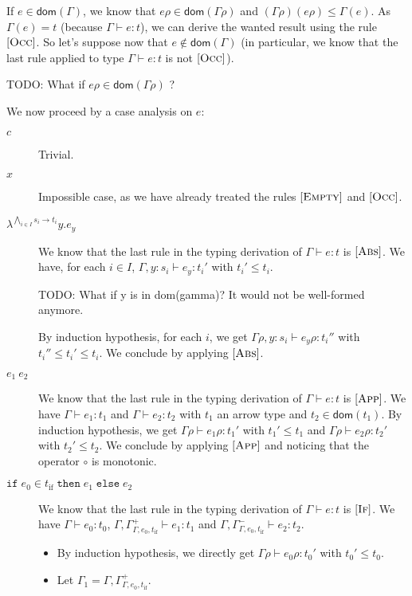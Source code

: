 \documentclass[a4paper]{article}%
\newcommand{\dom}[1]{\textsf{dom}(#1)}
\newcommand{\alt}{~|~}
\newcommand{\ite}[4]{\ensuremath{\texttt{if}\;#1\in#2\;\texttt{then}\;#3\;\texttt{else}\;#4}}
\newcommand{\tyof}[2]{\textsf{typeof}_{#2}(#1)}
\theoremstyle{definition}
\newcommand {\Rule}[1] {[\textsc{#1}]}
\begin{document}
        If $e\in\dom\Gamma$, we know that $e\rho\in\dom{\Gamma\rho}$ and $(\Gamma\rho)(e\rho) \leq \Gamma(e)$.
        As $\Gamma(e) = t$ (because $\Gamma \vdash e:t$), we can derive the wanted result using the rule $\Rule {Occ}$.
        So let's suppose now that $e\not\in\dom\Gamma$ (in particular, we know that the last rule applied to type $\Gamma \vdash e:t$ is not $\Rule{Occ}$).
        
        TODO: What if $e\rho\in\dom{\Gamma\rho}$ ? 

        We now proceed by a case analysis on $e$:
        
        \begin{description}
          \item[$c$] Trivial.
          \item[$x$] Impossible case, as we have already treated the rules $\Rule{Empty}$ and $\Rule{Occ}$.
          \item[$\lambda^{\bigwedge_{i\in I} s_i \rightarrow t_i}y.e_y$]
          We know that the last rule in the typing derivation of $\Gamma \vdash e:t$ is $\Rule {Abs}$.
          We have, for each $i \in I$, $\Gamma,y:s_i \vdash e_y:t_i'$ with $t_i'\leq t_i$.
          
          TODO: What if y is in dom(gamma)? It would not be well-formed anymore.

          By induction hypothesis, for each $i$, we get  $\Gamma\rho,y:s_i \vdash e_y\rho:t_i''$ with $t_i''\leq t_i'\leq t_i$. We conclude by applying $\Rule {Abs}$.
          \item[$e_1\ e_2$] We know that the last rule in the typing derivation of $\Gamma \vdash e:t$ is $\Rule {App}$.
          We have $\Gamma\vdash e_1:t_1$ and $\Gamma\vdash e_2:t_2$ with $t_1$ an arrow type and $t_2 \in \dom {t_1}$.
          By induction hypothesis, we get $\Gamma\rho\vdash e_1\rho:t_1'$ with $t_1' \leq t_1$ and $\Gamma\rho\vdash e_2\rho:t_2'$ with $t_2' \leq t_2$.
          We conclude by applying $\Rule {App}$ and noticing that the operator $\circ$ is monotonic.
          \item[$\ite {e_0} {t_{\text{if}}} {e_1}{e_2}$] We know that the last rule in the typing derivation of $\Gamma \vdash e:t$ is $\Rule {If}$.
          We have $\Gamma\vdash e_0:t_0$, $\Gamma,\Gamma^+_{\Gamma,e_0,t_{\text{if}}}\vdash e_1 : t_1$ and $\Gamma,\Gamma^-_{\Gamma,e_0,t_{\text{if}}}\vdash e_2 : t_2$.
          \begin{itemize}
            \item By induction hypothesis, we directly get $\Gamma\rho\vdash e_0\rho:t_0'$ with $t_0'\leq t_0$.
            \item Let $\Gamma_1 = \Gamma,\Gamma^+_{\Gamma,e_0,t_{\text{if}}}$.
            

\end{itemize}
\end{description}
\end{document}
